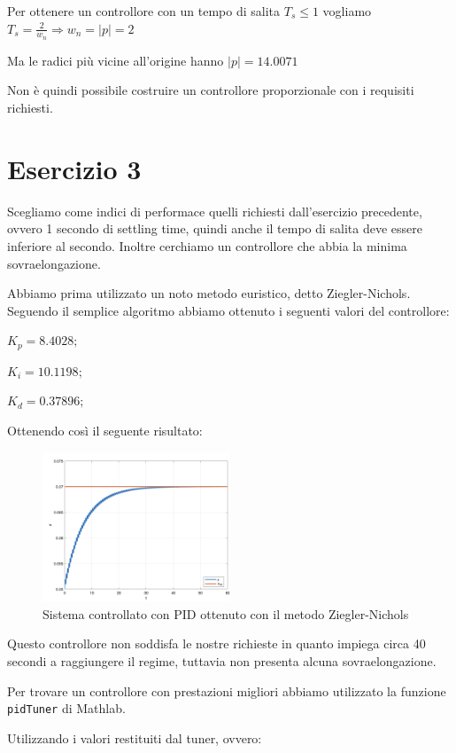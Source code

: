 \documentclass{article}
\newcommand{\spacer}[1][8pt]{
    \par\vspace{#1}
}
\begin{document}
Per ottenere un controllore con un tempo di salita $T_s \le 1$ vogliamo $T_s = \frac{2}{w_n} \Rightarrow w_n = |p| = 2$

Ma le radici più vicine all'origine hanno $|p| = 14.0071$

Non è quindi possibile costruire un controllore proporzionale con i requisiti richiesti.

\section{Esercizio 3}
Scegliamo come indici di performace quelli richiesti dall'esercizio precedente, ovvero 1 secondo di settling time, quindi anche il tempo di salita deve essere inferiore al secondo.
Inoltre cerchiamo un controllore che abbia la minima sovraelongazione.

\spacer
Abbiamo prima utilizzato un noto metodo euristico, detto Ziegler-Nichols. Seguendo il semplice algoritmo abbiamo ottenuto i seguenti valori del controllore:

$K_p = 8.4028;$

$K_i = 10.1198;$

$K_d = 0.37896;$

\spacer
Ottenendo così il seguente risultato:

\begin{figure}[H]
    \centering
    \includegraphics[width = 0.5\textwidth]{Images/PID-euristico.png}
    \caption{Sistema controllato con PID ottenuto con il metodo Ziegler-Nichols}
    \label{fig:Ziegler_Nichols_PID}
\end{figure}

Questo controllore non soddisfa le nostre richieste in quanto impiega circa 40 secondi a raggiungere il regime, tuttavia non presenta alcuna sovraelongazione.

\spacer
Per trovare un controllore con prestazioni migliori abbiamo utilizzato la funzione \texttt{pidTuner} di Mathlab.

Utilizzando i valori restituiti dal tuner, ovvero:
\end{document}
